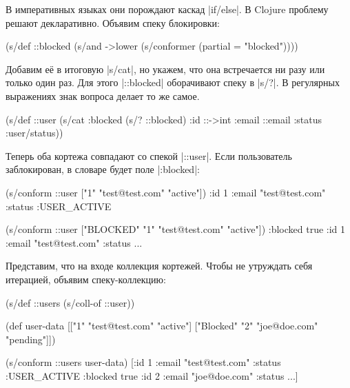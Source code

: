 В императивных языках они порождают каскад \spverb|if/else|. В Clojure
проблему решают декларативно. Объявим спеку блокировки:

\begin{english}
  \begin{clojure}
(s/def ::blocked
  (s/and
   ->lower
   (s/conformer (partial = "blocked"))))
  \end{clojure}
\end{english}


Добавим е\"{е} в итоговую \spverb|s/cat|, но укажем, что она встречается ни разу или
только один раз. Для этого \spverb|::blocked| оборачивают спеку в \spverb|s/?|.
В регулярных выражениях знак вопроса делает то же самое.

\begin{english}
  \begin{clojure}
(s/def ::user
  (s/cat :blocked (s/? ::blocked)
         :id ::->int
         :email ::email
         :status :user/status))
  \end{clojure}
\end{english}

Теперь оба кортежа совпадают со спекой \spverb|::user|. Если пользователь
заблокирован, в словаре будет поле \spverb|:blocked|:

\begin{english}
  \begin{clojure}
(s/conform ::user ["1" "test@test.com" "active"])
{:id 1 :email "test@test.com" :status :USER_ACTIVE}

(s/conform ::user ["BLOCKED" "1" "test@test.com" "active"])
{:blocked true :id 1 :email "test@test.com" :status ...}
  \end{clojure}
\end{english}

Представим, что на входе коллекция кортежей. Чтобы не утруждать себя итерацией,
объявим спеку-коллекцию:

\begin{english}
  \begin{clojure}
(s/def ::users (s/coll-of ::user))

(def user-data
  [["1" "test@test.com" "active"]
   ["Blocked" "2" "joe@doe.com" "pending"]])

(s/conform ::users user-data)
[{:id 1 :email "test@test.com" :status :USER_ACTIVE}
 {:blocked true :id 2 :email "joe@doe.com" :status ...}]
  \end{clojure}
\end{english}

